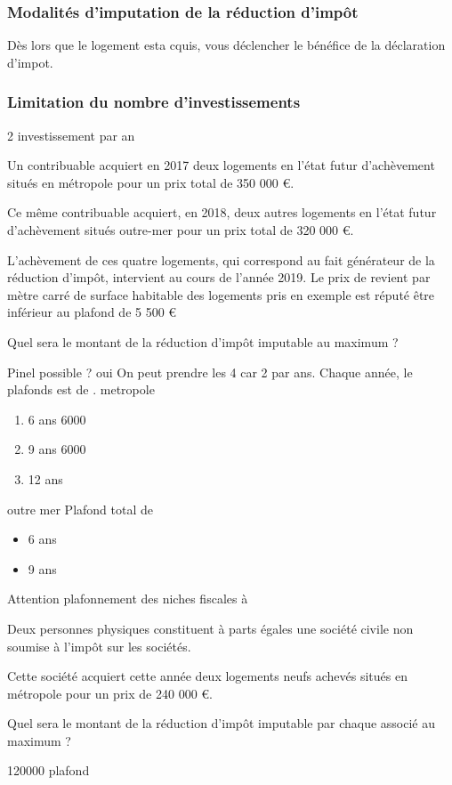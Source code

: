 			\subsubsection{Modalités d'imputation de la réduction d'impôt}

				Dès lors que le logement esta cquis, vous déclencher le bénéfice de la déclaration d'impot.

			\subsubsection{Limitation du nombre d'investissements}

				2 investissement par an

				\begin{casPratique}{%
					Un contribuable acquiert en 2017 deux logements en l'état futur d'achèvement situés en métropole pour un prix total de 350 000 €.

					Ce même contribuable acquiert, en 2018, deux autres logements en l'état futur d'achèvement situés outre-mer pour un prix total de 320 000 €.

					L'achèvement de ces quatre logements, qui correspond au fait générateur de la réduction d'impôt, intervient au cours de l'année 2019. Le prix de revient par mètre carré de surface habitable des logements pris en exemple est réputé être inférieur au plafond de 5 500 €

					Quel sera le montant de la réduction d'impôt imputable au maximum ?
					}
					Pinel possible ? oui
					On peut prendre les 4 car 2 par ans.
					Chaque année, le plafonds est de .
					metropole
					\begin{enumerate}
						\item 6 ans 6000
						\item 9 ans 6000
						\item 12 ans
					\end{enumerate}
					outre mer
					Plafond total de 
					\begin{itemize}
						\item 6 ans
						\item 9 ans
					\end{itemize}

					Attention plafonnement des niches fiscales à 
				\end{casPratique}
				\begin{casPratique}{%
					Deux personnes physiques constituent à parts égales une société civile non soumise à l'impôt sur les sociétés.

					Cette société acquiert cette année deux logements neufs achevés situés en métropole pour un prix de 240 000 €.

					Quel sera le montant de la réduction d'impôt imputable par chaque associé au maximum ?
					}
						120000
						plafond
				\end{casPratique}
